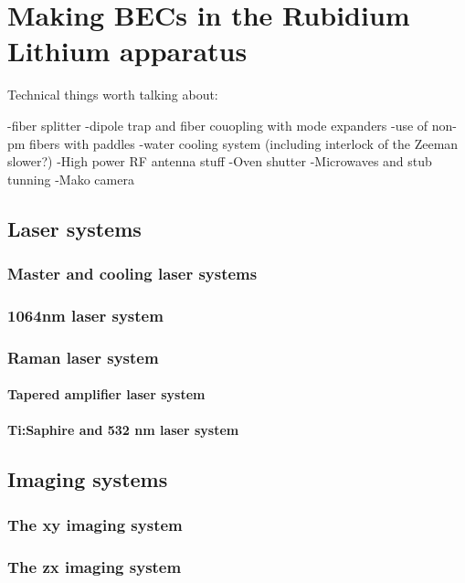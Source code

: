 


\renewcommand{\thechapter}{4}


\chapter{Making BECs in the Rubidium Lithium apparatus}

Technical things worth talking about:

-fiber splitter
-dipole trap and fiber couopling with mode expanders
-use of non-pm fibers with paddles
-water cooling system (including interlock of the Zeeman slower?)
-High power RF antenna stuff
-Oven shutter
-Microwaves and stub tunning
-Mako camera



\section{Laser systems}
\subsection{Master and cooling laser systems}
\subsection{1064nm laser system}
\subsection{Raman laser system}
\subsubsection{Tapered amplifier laser system}
\subsubsection{Ti:Saphire and 532 nm laser system}

\section{Imaging systems}
\subsection{The xy imaging system}
\subsection{The zx imaging system}
